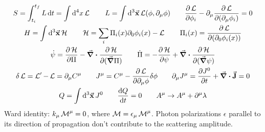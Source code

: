 \begin{gather*}
        S
        = \int_{t_i}^{t_f}L\dd{t}
        = \int\dd[4]{x} \Lc
        \qquad
        L = \int\dd[3]{\va{x}}\Lc(\phi,\partial_\mu\phi)
        \qquad
        \pdv{\Lc}{\phi_i} - \partial_\mu{\pdv{\Lc}{\qty(\partial_\mu \phi_i)}} = 0
        \\
        H = \int\dd[3]{\va{x}}\Hc
        \qquad
        \Hc = \sum_i\Pi_i(x)\partial_0\phi_i(x) - \Lc
        \qquad
        \Pi_i(x) = \pdv{\Lc}{\qty(\partial_0 \phi_i(x))}
        \\
        \dot{\psi} = \pdv{\Hc}{\Pi} - \divergence{\pdv{\Hc}{(\grad{\Pi})}}
        \qquad
        \dot{\Pi} = -\pdv{\Hc}{\psi} + \divergence{\pdv{\Hc}{(\grad{\psi})}}
        \\
        \delta\Lc = \Lc' - \Lc = \partial_\mu C^\mu
\qquad
        J^\mu = C^\mu - \pdv{\Lc}{\partial_\mu\phi}\delta\phi
        \qquad
        \partial_\mu J^\mu = \pdv{J^0}{t} + \divergence{\va{J}} = 0
        \\
        Q = \int\dd[3]{\va{x}} J^0
        \qquad
        \dv{Q}{t} = 0
        \qquad
        A^\mu \to A^\mu + \partial^\mu\lambda
\end{gather*}
Ward identity: $k_\mu \operatorname{\mathcal{M}}^\mu=0$, where $\operatorname{\mathcal{M}}=\epsilon_\mu \operatorname{\mathcal{M}}^\mu$. Photon polarizations $\epsilon$ parallel to its direction of propagation don't contribute to the scattering amplitude.
